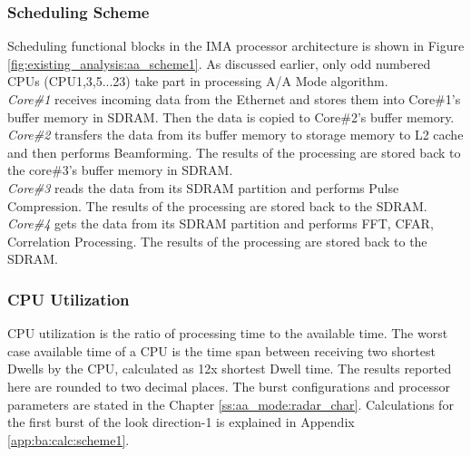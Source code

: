 \subsubsection{Scheduling Scheme}
\label{sss:scheme1:aa:sched_blocks}
Scheduling functional blocks in the IMA processor architecture is shown in Figure \ref{fig:existing_analysis:aa_scheme1}. As discussed earlier, only odd numbered CPUs (CPU1,3,5...23) take part in processing A/A Mode algorithm.\\[0.3cm]
\textsl{Core\#1} receives incoming data from the Ethernet and stores them into Core\#1's buffer memory in SDRAM. Then the data is copied to Core\#2's buffer memory.\\[0.2cm]
\textsl{Core\#2} transfers the data from its buffer memory to storage memory to L2 cache and then performs Beamforming. The results of the processing are stored back to the core\#3's buffer memory in SDRAM.\\[0.2cm]
\textsl{Core\#3} reads the data from its SDRAM partition and performs Pulse Compression. The results of the processing are stored back to the SDRAM.\\[0.2cm]
\textsl{Core\#4} gets the data from its SDRAM partition and performs FFT, CFAR, Correlation Processing. The results of the processing are stored back to the SDRAM.

\subsubsection{CPU Utilization}
\label{sss:scheme1:aa:cpu_util}
CPU utilization is the ratio of processing time to the available time. The worst case available time of a CPU is the time span between receiving two shortest Dwells by the CPU, calculated as 12x shortest Dwell time. The results reported here are rounded to two decimal places. The burst configurations and processor parameters are stated in the Chapter \ref{ss:aa_mode:radar_char}. Calculations for the first burst of the look direction-1 is explained in Appendix \ref{app:ba:calc:scheme1}. 

